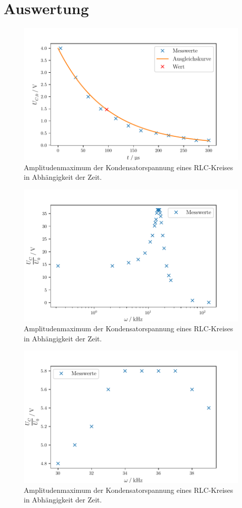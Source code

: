 \section{Auswertung}
\label{sec:Auswertung}

\begin{figure}
  \centering
  \includegraphics{build/plot1.pdf}
  \caption{Amplitudenmaximum der Kondensatorspannung eines RLC-Kreises in Abhängigkeit der Zeit.}
  \label{fig:plot}
\end{figure}
\begin{figure}
  \centering
  \includegraphics{build/plot2.pdf}
  \caption{Amplitudenmaximum der Kondensatorspannung eines RLC-Kreises in Abhängigkeit der Zeit.}
  \label{fig:plot}
\end{figure}

\begin{figure}
  \centering
  \includegraphics{build/plot3.pdf}
  \caption{Amplitudenmaximum der Kondensatorspannung eines RLC-Kreises in Abhängigkeit der Zeit.}
  \label{fig:plot}
\end{figure}







